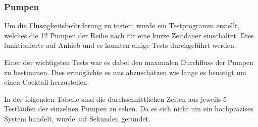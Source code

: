 \subsubsection{Pumpen}
\label{subsubsec:Inbetriebnahme_Pumpen}

Um die Flüssigkeitsbeförderung zu testen, wurde ein Testprogramm erstellt, welches die 12 Pumpen der Reihe nach für eine kurze Zeitdauer einschaltet. Dies funktionierte auf Anhieb und es konnten einige Tests durchgeführt werden. 

Einer der wichtigsten Tests war es dabei den maximalen Durchfluss der Pumpen zu bestimmen. Dies ermöglichte es uns abzuschätzen wie lange es benötigt um einen Cocktail herzustellen. 

In der folgenden Tabelle sind die durchschnittlichen Zeiten aus jeweils 5 Testläufen der einzelnen Pumpen zu sehen. Da es sich nicht um ein hochpräzises System handelt, wurde auf Sekunden gerundet.


